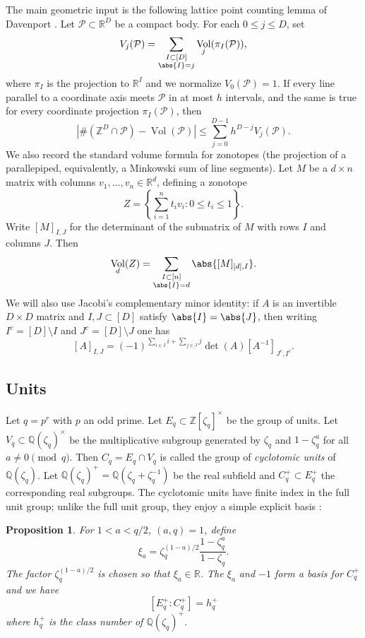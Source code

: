 \documentclass{article}
\newtheorem{prop}{Proposition}
\newcommand{\bQ}{\mathbb{Q}}
\newcommand{\bR}{\mathbb{R}}
\newcommand{\bZ}{\mathbb{Z}}
\DeclareMathOperator{\Vol}{Vol}
\def\cP{{\mathcal P}}
\begin{document}
The main geometric input is the following lattice point counting lemma of Davenport \cite{Davenport1951}. Let $\cP \subset \bR^D$ be a compact body. For each $0 \leq j \leq D$, set
\[
V_j(\cP) = \sum_{\substack{I \subset [D] \\ \abs{I} = j}} \Vol_j (\pi_I(\cP)),
\]
where $\pi_I$ is the projection to $\bR^I$ and we normalize $V_0(\cP)=1$. If every line parallel to a coordinate axis meets $\cP$ in at most $h$ intervals, and the same is true for every coordinate projection $\pi_I(\cP)$, then
\[
\left| \#(\bZ^D \cap \cP) - \operatorname{Vol}(\cP) \right|
\leq
\sum_{j=0}^{D-1} h^{D-j} V_j(\cP).
\]
We also record the standard volume formula for zonotopes (the projection of a parallepiped, equivalently, a Minkowski sum of line segments).  Let $M$ be a $d \times n$ matrix with columns $v_1,\dots,v_n \in \bR^d$, defining a zonotope
\[
Z=\left\{ \sum_{i=1}^n t_i v_i : 0 \leq t_i \leq 1 \right\}.
\]
Write $[M]_{I,J}$ for the determinant of the submatrix of $M$ with rows $I$ and columns $J$. Then
\[
\Vol_d(Z)
=
\sum_{\substack{I \subset [n] \\ \abs{I}=d}}
\abs{[M]_{[d],I}}.
\]
We will also use Jacobi's complementary minor identity: if $A$ is an invertible $D \times D$ matrix and $I,J \subset [D]$ satisfy $\abs{I}=\abs{J}$, then writing $I^c=[D] \setminus I$ and $J^c=[D] \setminus J$ one has
\[
[A]_{I,J}
=
(-1)^{\sum_{i \in I} i + \sum_{j \in J} j}
\det(A)[A^{-1}]_{J^c,I^c}.
\]


\subsection{Units}
Let $q=p^r$ with $p$ an odd prime. Let $E_q \subset \bZ[\zeta_q]^\times$ be the group of units. Let $V_q \subset \bQ(\zeta_q)^\times$ be the multiplicative subgroup generated by $\zeta_q$ and $1-\zeta_q^a$ for all $a \neq 0 \pmod q$. Then $C_q = E_q \cap V_q$ is called the group of \textit{cyclotomic units} of $\bQ(\zeta_q)$.
Let $\bQ(\zeta_q)^+ = \bQ(\zeta_q+\zeta_q^{-1})$ be the real subfield and $C^+_q \subset E^+_q$ the corresponding real subgroups. The cyclotomic units have finite index in the full unit group; unlike the full unit group, they enjoy a simple explicit basis \cite[Theorem 8.2]{Washington1997}:
\begin{prop}
For $1<a<q/2$, $(a,q)=1$, define
\[
\xi_a=\zeta_q^{(1-a)/2} \frac{1-\zeta_q^a}{1-\zeta_q}.
\]
The factor $\zeta_q^{(1-a)/2}$ is chosen so that $\xi_a \in \bR$. The $\xi_a$ and $-1$ form a basis for $C^+_q$ and we have
\[
\left[E_q^+:C_q^+ \right]=h_q^+
\]
where $h_q^+$ is the class number of $\bQ(\zeta_q)^+$.
\end{prop}
\end{document}
